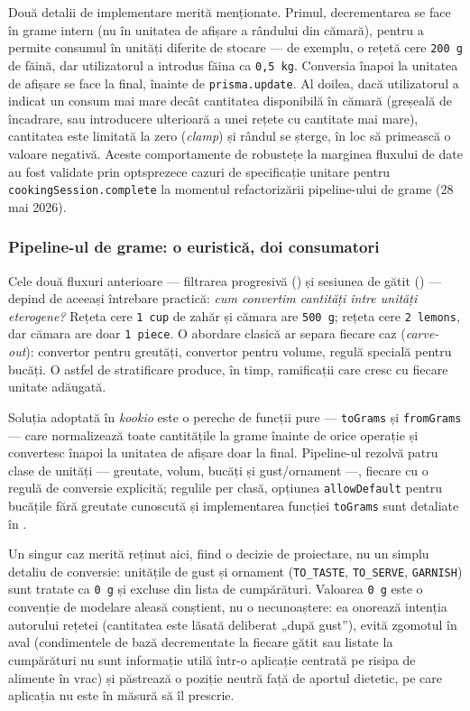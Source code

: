 Două detalii de implementare merită menționate. Primul, decrementarea se face în grame intern (nu în unitatea de afișare a rândului din cămară), pentru a permite consumul în unități diferite de stocare --- de exemplu, o rețetă cere \texttt{200 g} de făină, dar utilizatorul a introdus făina ca \texttt{0,5 kg}. Conversia înapoi la unitatea de afișare se face la final, înainte de \texttt{prisma.update}. Al doilea, dacă utilizatorul a indicat un consum mai mare decât cantitatea disponibilă în cămară (greșeală de încadrare, sau introducere ulterioară a unei rețete cu cantitate mai mare), cantitatea este limitată la zero (\textit{clamp}) și rândul se șterge, în loc să primească o valoare negativă. Aceste comportamente de robustețe la marginea fluxului de date au fost validate prin optsprezece cazuri de specificație unitare pentru \texttt{cookingSession.complete} la momentul refactorizării pipeline-ului de grame (28 mai 2026).

\subsubsection{Pipeline-ul de grame: o euristică, doi consumatori}\label{subsec:algoritm-grame}

Cele două fluxuri anterioare --- filtrarea progresivă () și sesiunea de gătit () --- depind de aceeași întrebare practică: \textit{cum convertim cantități între unități eterogene?} Rețeta cere \texttt{1 cup} de zahăr și cămara are \texttt{500 g}; rețeta cere \texttt{2 lemons}, dar cămara are doar \texttt{1 piece}. O abordare clasică ar separa fiecare caz (\textit{carve-out}): convertor pentru greutăți, convertor pentru volume, regulă specială pentru bucăți. O astfel de stratificare produce, în timp, ramificații care cresc cu fiecare unitate adăugată.

Soluția adoptată în \textit{\gls{kookio}} este o pereche de funcții pure --- \texttt{toGrams} și \texttt{fromGrams} --- care normalizează toate cantitățile la grame înainte de orice operație și convertesc înapoi la unitatea de afișare doar la final. Pipeline-ul rezolvă patru clase de unități --- greutate, volum, bucăți și gust/ornament ---, fiecare cu o regulă de conversie explicită; regulile per clasă, opțiunea \texttt{allowDefault} pentru bucățile fără greutate cunoscută și implementarea funcției \texttt{toGrams} sunt detaliate în .

Un singur caz merită reținut aici, fiind o decizie de proiectare, nu un simplu detaliu de conversie: unitățile de gust și ornament (\texttt{TO\_TASTE}, \texttt{TO\_SERVE}, \texttt{GARNISH}) sunt tratate ca \texttt{0 g} și excluse din lista de cumpărături. Valoarea \texttt{0 g} este o convenție de modelare aleasă conștient, nu o necunoaștere: ea onorează intenția autorului rețetei (cantitatea este lăsată deliberat „după gust”), evită zgomotul în aval (condimentele de bază decrementate la fiecare gătit sau listate la cumpărături nu sunt informație utilă într-o aplicație centrată pe risipa de alimente în vrac) și păstrează o poziție neutră față de aportul dietetic, pe care aplicația nu este în măsură să îl prescrie.

